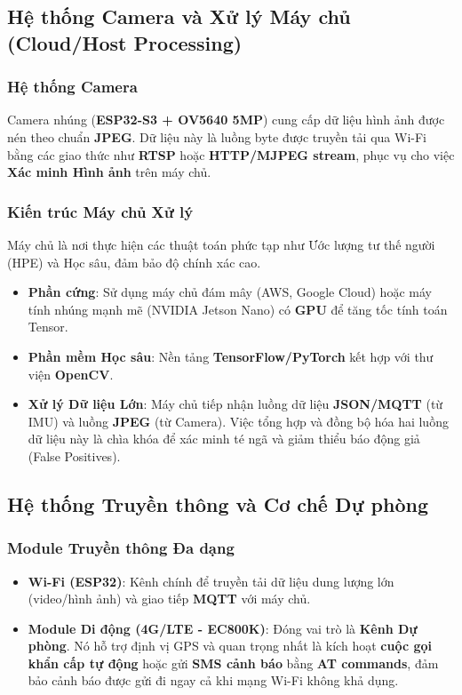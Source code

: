 \subsection{Hệ thống Camera và Xử lý Máy chủ (Cloud/Host Processing)}

\subsubsection{Hệ thống Camera}
Camera nhúng (\textbf{ESP32-S3 + OV5640 5MP}) cung cấp dữ liệu hình ảnh được nén theo chuẩn \textbf{JPEG}. Dữ liệu này là luồng byte được truyền tải qua Wi-Fi bằng các giao thức như \textbf{RTSP} hoặc \textbf{HTTP/MJPEG stream}, phục vụ cho việc \textbf{Xác minh Hình ảnh} trên máy chủ.

\subsubsection{Kiến trúc Máy chủ Xử lý}
Máy chủ là nơi thực hiện các thuật toán phức tạp như Ước lượng tư thế người (HPE) và Học sâu, đảm bảo độ chính xác cao.
\begin{itemize}
    \item \textbf{Phần cứng}: Sử dụng máy chủ đám mây (AWS, Google Cloud) hoặc máy tính nhúng mạnh mẽ (NVIDIA Jetson Nano) có \textbf{GPU} để tăng tốc tính toán Tensor.
    \item \textbf{Phần mềm Học sâu}: Nền tảng \textbf{TensorFlow/PyTorch} kết hợp với thư viện \textbf{OpenCV}.
    \item \textbf{Xử lý Dữ liệu Lớn}: Máy chủ tiếp nhận luồng dữ liệu \textbf{JSON/MQTT} (từ IMU) và luồng \textbf{JPEG} (từ Camera). Việc tổng hợp và đồng bộ hóa hai luồng dữ liệu này là chìa khóa để xác minh té ngã và giảm thiểu báo động giả (False Positives).
\end{itemize}

\subsection{Hệ thống Truyền thông và Cơ chế Dự phòng}

\subsubsection{Module Truyền thông Đa dạng}
\begin{itemize}
    \item \textbf{Wi-Fi (ESP32)}: Kênh chính để truyền tải dữ liệu dung lượng lớn (video/hình ảnh) và giao tiếp \textbf{MQTT} với máy chủ.
    \item \textbf{Module Di động (4G/LTE - EC800K)}: Đóng vai trò là \textbf{Kênh Dự phòng}. Nó hỗ trợ định vị GPS và quan trọng nhất là kích hoạt \textbf{cuộc gọi khẩn cấp tự động} hoặc gửi \textbf{SMS cảnh báo} bằng \textbf{AT commands}, đảm bảo cảnh báo được gửi đi ngay cả khi mạng Wi-Fi không khả dụng.
\end{itemize}


